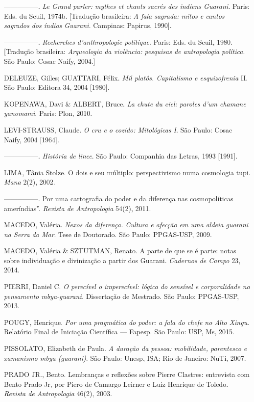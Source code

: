 ---------------. \emph{Le Grand parler: mythes et chants sacrés des
indiens Guarani.} Paris: Eds. du Seuil, 1974b. {[}Tradução brasileira:
\emph{A fala sagrada: mitos e cantos sagrados dos índios Guarani.}
Campinas: Papirus, 1990{]}.

---------------. \emph{Recherches d'anthropologie politique}. Paris:
Eds. du Seuil, 1980. {[}Tradução brasileira: \emph{Arqueologia da
violência: pesquisas de antropologia política}. São Paulo: Cosac Naify,
2004.{]}

DELEUZE, Gilles; GUATTARI, Félix. \emph{Mil platôs. Capitalismo e
esquizofrenia} II. São Paulo: Editora 34, 2004 {[}1980{]}.

KOPENAWA, Davi \& ALBERT, Bruce. \emph{La chute du ciel: paroles d'um
chamane yanomami}. Paris: Plon, 2010.

LEVI-STRAUSS, Claude. \emph{O cru e o cozido: Mitológicas I}. São Paulo:
Cosac Naify, 2004 {[}1964{]}.

---------------. \emph{História de lince}. São Paulo: Companhia das
Letras, 1993 {[}1991{]}.

LIMA, Tânia Stolze. O dois e seu múltiplo: perspectivismo numa
cosmologia tupi. \emph{Mana} 2(2), 2002.

---------------. Por uma cartografia do poder e da diferença nas
cosmopolíticas ameríndias''. \emph{Revista de Antropologia} 54(2), 2011.

MACEDO, Valéria. \emph{Nexos da diferença. Cultura e afecção em uma
aldeia guarani na Serra do Mar}. Tese de Doutorado. São Paulo:
PPGAS-USP, 2009.

MACEDO, Valéria \& SZTUTMAN, Renato. A parte de que se é parte: notas
sobre individuação e divinização a partir dos Guarani. \emph{Cadernos de
Campo} 23, 2014.

PIERRI, Daniel C. \emph{O perecível o imperecível: lógica do sensível e
corporalidade no pensamento mbya-guarani.} Dissertação de Mestrado. São
Paulo: PPGAS-USP, 2013.

POUGY, Henrique. \emph{Por uma pragmática do poder: a fala do chefe no
Alto Xingu}. Relatório Final de Iniciação Científica --- Fapesp. São
Paulo: USP, Ms, 2015.

PISSOLATO, Elizabeth de Paula. \emph{A duração da pessoa: mobilidade,
parentesco e xamanismo mbya (guarani)}. São Paulo: Unesp, ISA; Rio de
Janeiro: NuTi, 2007.

PRADO JR., Bento. Lembranças e reflexões sobre Pierre Clastres:
entrevista com Bento Prado Jr, por Piero de Camargo Leirner e Luiz
Henrique de Toledo. \emph{Revista de Antropologia} 46(2), 2003.

